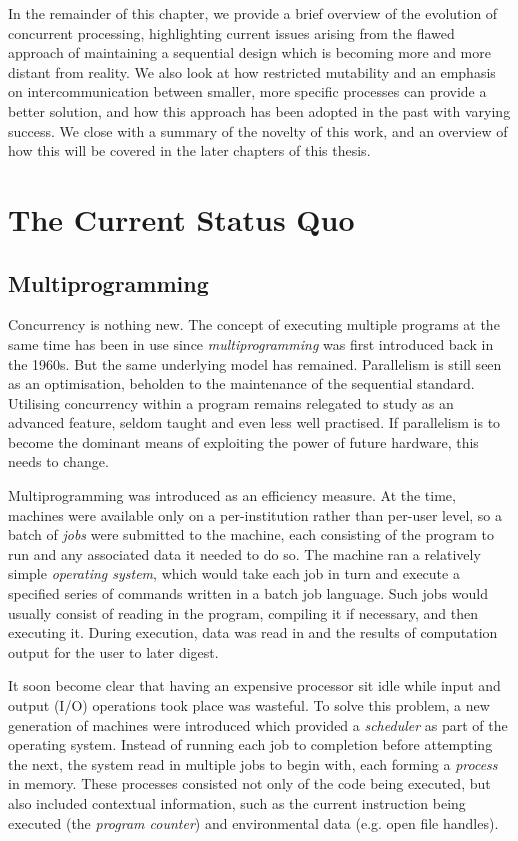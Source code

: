 In the remainder of this chapter, we provide a brief overview of the
evolution of concurrent processing, highlighting current issues
arising from the flawed approach of maintaining a sequential design
which is becoming more and more distant from reality.  We also look at
how restricted mutability and an emphasis on intercommunication
between smaller, more specific processes can provide a better
solution, and how this approach has been adopted in the past with
varying success.  We close with a summary of the novelty of this work,
and an overview of how this will be covered in the later chapters of
this thesis.

\section{The Current Status Quo}

\subsection{Multiprogramming}

Concurrency is nothing new.  The concept of executing multiple
programs at the same time has been in use since
\emph{multiprogramming} was first introduced back in the 1960s.  But
the same underlying model has remained.  Parallelism is still seen as
an optimisation, beholden to the maintenance of the sequential
standard.  Utilising concurrency within a program remains relegated to
study as an advanced feature, seldom taught and even less well
practised.  If parallelism is to become the dominant means of
exploiting the power of future hardware, this needs to change.

Multiprogramming was introduced as an efficiency measure.  At the
time, machines were available only on a per-institution rather than
per-user level, so a batch of \emph{jobs} were submitted to the
machine, each consisting of the program to run and any associated data
it needed to do so.  The machine ran a relatively simple
\emph{operating system}, which would take each job in turn and execute
a specified series of commands written in a batch job language.  Such
jobs would usually consist of reading in the program, compiling it if
necessary, and then executing it.  During execution, data was read in
and the results of computation output for the user to later digest.

It soon become clear that having an expensive processor sit idle while
input and output (I/O) operations took place was wasteful.  To solve
this problem, a new generation of machines were introduced which
provided a \emph{scheduler} as part of the operating system.  Instead
of running each job to completion before attempting the next, the
system read in multiple jobs to begin with, each forming a
\emph{process} in memory.  These processes consisted not only of the
code being executed, but also included contextual information, such as
the current instruction being executed (the \emph{program counter})
and environmental data (e.g. open file handles).

